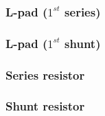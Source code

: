 \clearpage
\subsubsection{L-pad ($1^{st}$ series)}
	

\clearpage
\subsubsection{L-pad ($1^{st}$ shunt)}
	

\clearpage
\subsubsection{Series resistor}
	

\clearpage
\subsubsection{Shunt resistor}
	
